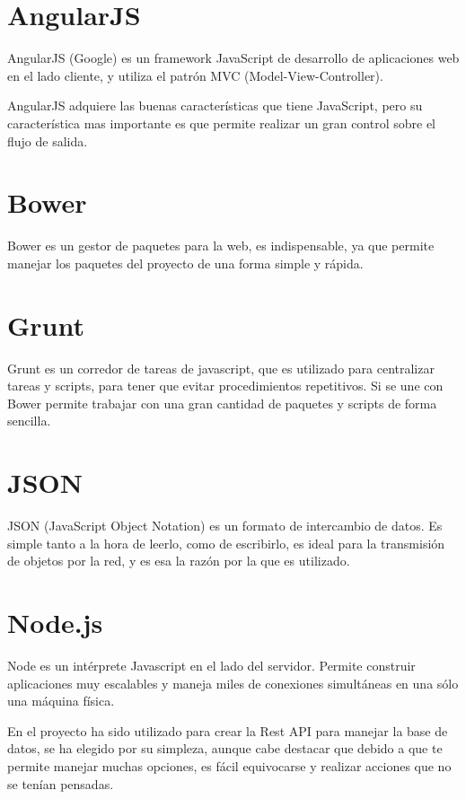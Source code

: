 \section{AngularJS}\label{AngularJS}

AngularJS (Google) es un framework JavaScript de desarrollo de aplicaciones web en el lado cliente, y utiliza el patrón MVC (Model-View-Controller).

AngularJS adquiere las buenas características que tiene JavaScript, pero su característica mas importante es que permite realizar un gran control sobre el flujo de salida.

\section{Bower}\label{Bower}

Bower es un gestor de paquetes para la web, es indispensable, ya que permite manejar los paquetes del proyecto de una forma simple y rápida.

\section{Grunt}\label{Grunt}

Grunt es un corredor de tareas de javascript, que es utilizado para centralizar tareas y scripts, para tener que evitar procedimientos repetitivos. Si se une con Bower permite trabajar con una gran cantidad de paquetes y scripts de forma sencilla. 

\section{JSON}\label{JSON}
JSON (JavaScript Object Notation) es un formato de intercambio de datos. Es simple tanto a  la  hora de leerlo, como de escribirlo, es ideal para la transmisión de objetos por la red, y es esa la razón por la que es utilizado.

\section{Node.js}\label{Node.js}

Node es un intérprete Javascript en el lado del servidor. Permite construir aplicaciones muy escalables y  maneja miles de conexiones simultáneas en una sólo una máquina física.

En el proyecto ha sido utilizado para crear la Rest API para manejar la base de datos, se ha elegido por su simpleza, aunque cabe destacar que debido a que te permite manejar muchas opciones, es fácil equivocarse y realizar acciones que no se tenían pensadas.

